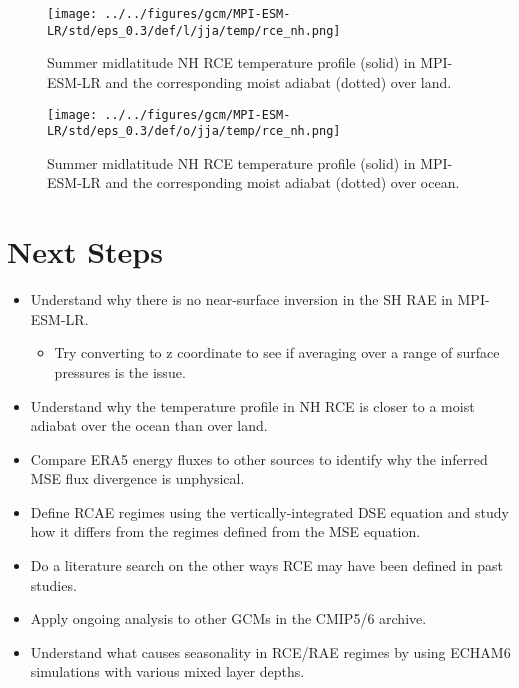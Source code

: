 \documentclass[11pt]{article}
\begin{document}
\begin{figure}[htbp]
\centering
\texttt{[image: ../../figures/gcm/MPI-ESM-LR/std/eps\_0.3/def/l/jja/temp/rce\_nh.png]}
\caption{\label{fig:org90dd0cf}Summer midlatitude NH RCE temperature profile (solid) in MPI-ESM-LR and the corresponding moist adiabat (dotted) over land.}
\end{figure}

\begin{figure}[htbp]
\centering
\texttt{[image: ../../figures/gcm/MPI-ESM-LR/std/eps\_0.3/def/o/jja/temp/rce\_nh.png]}
\caption{\label{fig:orgfa5ae52}Summer midlatitude NH RCE temperature profile (solid) in MPI-ESM-LR and the corresponding moist adiabat (dotted) over ocean.}
\end{figure}

\section{Next Steps}
\label{sec:org87da570}
\begin{itemize}
\item Understand why there is no near-surface inversion in the SH RAE in MPI-ESM-LR.
\begin{itemize}
\item Try converting to z coordinate to see if averaging over a range of surface pressures is the issue.
\end{itemize}
\item Understand why the temperature profile in NH RCE is closer to a moist adiabat over the ocean than over land.
\item Compare ERA5 energy fluxes to other sources to identify why the inferred MSE flux divergence is unphysical.
\item Define RCAE regimes using the vertically-integrated DSE equation and study how it differs from the regimes defined from the MSE equation.
\item Do a literature search on the other ways RCE may have been defined in past studies.
\item Apply ongoing analysis to other GCMs in the CMIP5/6 archive.
\item Understand what causes seasonality in RCE/RAE regimes by using ECHAM6 simulations with various mixed layer depths.
\end{itemize}



\end{document}
